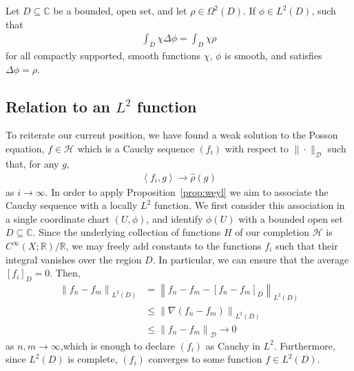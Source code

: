 \begin{proposition}\label{prop:weyl}
	Let $ D \subseteq \mathbb{C} $ be a bounded, open set, and let $ \rho \in
		\Omega^2(D) $. If $ \phi \in L^{2}(D) $, such that
	\begin{align*}
		\int_{D}{\chi \Delta \phi} = \int_{D}{\chi \rho}
	\end{align*}
	for all compactly supported, smooth functions $ \chi $, $ \phi $ is smooth,
	and satisfies $ \Delta \phi = \rho $.
\end{proposition}

\subsection{Relation to an $ L^{2} $ function}
To reiterate our current position, we have found a weak solution to the Posson
equation, $ f \in \mathcal{H} $ which is a Cauchy sequence $ ( f_{i} ) $ with
respect to $ \| \cdot  \|_{\mathcal{D}} $ such that, for any $ g $,
\begin{align*}
	\left\langle f_{i},g \right\rangle \to \hat{\rho}( g )
\end{align*}
as $ i \to \infty $. In order to apply Proposition~\ref{prop:weyl} we aim to
associate the Cauchy sequence with a locally $ L^{2} $ function. We first
consider this association in a single coordinate chart $ ( U, \phi ) $, and
identify $ \phi ( U ) $ with a bounded open set $ D \subseteq \mathbb{C} $.
Since the underlying collection of functions $ H $ of our completion $
	\mathcal{H} $ is $ C^{\infty}( X;\mathbb{R} )/\mathbb{R} $, we may freely add
constants to the functions $ f_{i} $ such that their integral vanishes over the
region $ D $. In particular, we can ensure that the average $ [ f_{i} ]_{D}=0 $.
Then,
\begin{align*}
	\left\| f_{n}-f_{m} \right\|_{L^{2}(D)} & = \left\| f_{n}-f_{m} -
	[ f_{n}-f_{m} ]_{D} \right\|_{L^{2}(D)}                                       \\
	                                        & \leq \left\| \nabla ( f_{n}-f_{m} )
	\right\|_{L^{2}(D)}                                                           \\
	                                        & \leq \left\| f_{n}-f_{m}
	\right\|_{\mathcal{D}} \to 0
\end{align*}
as $ n,m \to \infty $,which is enough to declare $ ( f_{i} ) $ as Cauchy in $
	L^{2} $. Furthermore, since $ L^{2}(D) $ is complete, $ ( f_{i} ) $ converges to
some function $ f \in L^{2}(D) $.

